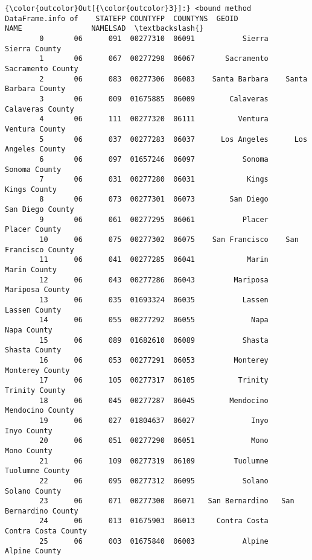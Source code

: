 \documentclass[11pt]{article}
\begin{document}
\begin{Verbatim}[commandchars=\\\{\}]
{\color{outcolor}Out[{\color{outcolor}3}]:} <bound method DataFrame.info of    STATEFP COUNTYFP  COUNTYNS  GEOID             NAME                NAMELSAD  \textbackslash{}
        0       06      091  00277310  06091           Sierra           Sierra County   
        1       06      067  00277298  06067       Sacramento       Sacramento County   
        2       06      083  00277306  06083    Santa Barbara    Santa Barbara County   
        3       06      009  01675885  06009        Calaveras        Calaveras County   
        4       06      111  00277320  06111          Ventura          Ventura County   
        5       06      037  00277283  06037      Los Angeles      Los Angeles County   
        6       06      097  01657246  06097           Sonoma           Sonoma County   
        7       06      031  00277280  06031            Kings            Kings County   
        8       06      073  00277301  06073        San Diego        San Diego County   
        9       06      061  00277295  06061           Placer           Placer County   
        10      06      075  00277302  06075    San Francisco    San Francisco County   
        11      06      041  00277285  06041            Marin            Marin County   
        12      06      043  00277286  06043         Mariposa         Mariposa County   
        13      06      035  01693324  06035           Lassen           Lassen County   
        14      06      055  00277292  06055             Napa             Napa County   
        15      06      089  01682610  06089           Shasta           Shasta County   
        16      06      053  00277291  06053         Monterey         Monterey County   
        17      06      105  00277317  06105          Trinity          Trinity County   
        18      06      045  00277287  06045        Mendocino        Mendocino County   
        19      06      027  01804637  06027             Inyo             Inyo County   
        20      06      051  00277290  06051             Mono             Mono County   
        21      06      109  00277319  06109         Tuolumne         Tuolumne County   
        22      06      095  00277312  06095           Solano           Solano County   
        23      06      071  00277300  06071   San Bernardino   San Bernardino County   
        24      06      013  01675903  06013     Contra Costa     Contra Costa County   
        25      06      003  01675840  06003           Alpine           Alpine County   

\end{Verbatim}
\end{document}
